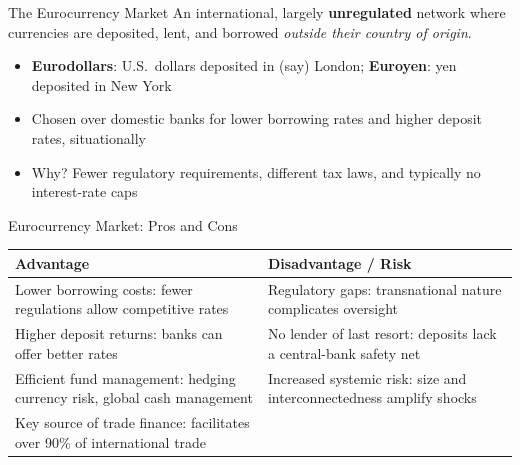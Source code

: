 \documentclass[aspectratio=169]{beamer}
\begin{document}
\begin{frame}{The Eurocurrency Market}
An international, largely \textbf{unregulated} network where currencies are deposited, lent, and borrowed \emph{outside their country of origin}.
\begin{itemize}
  \item \textbf{Eurodollars}: U.S.\ dollars deposited in (say) London; \textbf{Euroyen}: yen deposited in New York
  \item Chosen over domestic banks for lower borrowing rates and higher deposit rates, situationally
  \item Why? Fewer regulatory requirements, different tax laws, and typically no interest-rate caps
\end{itemize}
\end{frame}

\begin{frame}{Eurocurrency Market: Pros and Cons}
\begin{table}
\centering
\small
\begin{tabular}{p{}p{}}
\toprule
\textbf{Advantage} & \textbf{Disadvantage / Risk} \\
\midrule
Lower borrowing costs: fewer regulations allow competitive rates & Regulatory gaps: transnational nature complicates oversight \\
Higher deposit returns: banks can offer better rates & No lender of last resort: deposits lack a central-bank safety net \\
Efficient fund management: hedging currency risk, global cash management & Increased systemic risk: size and interconnectedness amplify shocks \\
Key source of trade finance: facilitates over 90\% of international trade & \\
\bottomrule
\end{tabular}
\end{table}
\end{frame}
\end{document}

